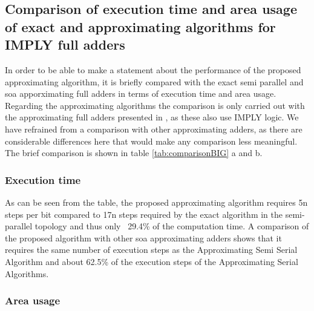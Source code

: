\documentclass[]{IEEEtran}
\begin{document}
\subsection{Comparison of execution time and area usage of exact and approximating algorithms for IMPLY full adders}
In order to be able to make a statement about the performance of the proposed approximating algorithm, it is briefly compared with the exact semi parallel and \gls{soa} apporximating full adders in terms of execution time and area usage. Regarding the approximating algorithms the comparison is only carried out with the approximating full adders presented in \cite{10305490, 7946813, 10032497}, as these also use IMPLY logic. We have refrained from a comparison with other approximating adders, as there are considerable differences here that would make any comparison less meaningful. The brief comparison is shown in table \ref{tab:comparisonBIG} a and b. 
\subsubsection{Execution time}
As can be seen from the table, the proposed approximating algorithm requires 5n steps per bit compared to 17n steps required by the exact algorithm in the semi-parallel topology and thus only ~29.4\% of the computation time. A comparison of the proposed algorithm with other soa approximating adders shows that it requires the same number of execution steps as the Approximating Semi Serial Algorithm and about 62.5\% of the execution steps of the Approximating Serial Algorithms.

\subsubsection{Area usage}



\end{document}
